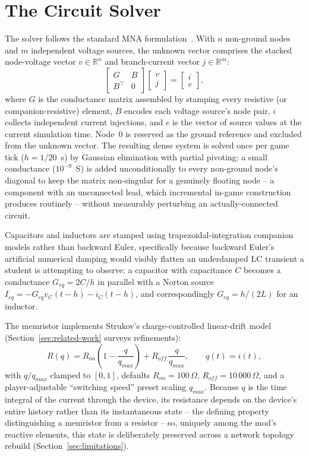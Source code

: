 \section{The Circuit Solver}
\label{sec:circuit-solver}

The solver follows the standard MNA formulation~\cite{ho1975mna}. With $n$ non-ground nodes
and $m$ independent voltage sources, the unknown vector comprises the stacked node-voltage
vector $v \in \mathbb{R}^n$ and branch-current vector $j \in \mathbb{R}^m$:
\begin{equation}
\begin{bmatrix} G & B \\ B^{\top} & 0 \end{bmatrix}
\begin{bmatrix} v \\ j \end{bmatrix}
=
\begin{bmatrix} i \\ e \end{bmatrix},
\end{equation}
where $G$ is the conductance matrix assembled by stamping every resistive (or
companion-resistive) element, $B$ encodes each voltage source's node pair, $i$ collects
independent current injections, and $e$ is the vector of source values at the current
simulation time. Node~0 is reserved as the ground reference and excluded from the unknown
vector. The resulting dense system is solved once per game tick ($h=1/20$~s) by Gaussian
elimination with partial pivoting; a small conductance ($10^{-9}$~S) is added unconditionally
to every non-ground node's diagonal to keep the matrix non-singular for a genuinely floating
node -- a component with an unconnected lead, which incremental in-game construction produces
routinely -- without measurably perturbing an actually-connected circuit.

Capacitors and inductors are stamped using trapezoidal-integration companion models rather
than backward Euler, specifically because backward Euler's artificial numerical damping would
visibly flatten an underdamped LC transient a student is attempting to observe: a capacitor
with capacitance $C$ becomes a conductance $G_{eq}=2C/h$ in parallel with a Norton source
$I_{eq}=-G_{eq}v_C(t-h)-i_C(t-h)$, and correspondingly $G_{eq}=h/(2L)$ for an inductor.

The memristor implements Strukov's charge-controlled linear-drift
model~\cite{strukov2008missing} (Section~\ref{sec:related-work} surveys refinements):
\begin{equation}
R(q) = R_{on}\left(1 - \frac{q}{q_{max}}\right) + R_{off}\,\frac{q}{q_{max}}, \qquad
\dot{q}(t) = i(t),
\end{equation}
with $q/q_{max}$ clamped to $[0,1]$, defaults $R_{on}=100\,\Omega$, $R_{off}=10\,000\,\Omega$,
and a player-adjustable ``switching speed'' preset scaling $q_{max}$. Because $q$ is the time
integral of the current through the device, its resistance depends on the device's entire
history rather than its instantaneous state -- the defining property distinguishing a
memristor from a resistor -- so, uniquely among the mod's reactive elements, this state is
deliberately preserved across a network topology rebuild (Section~\ref{sec:limitations}).

